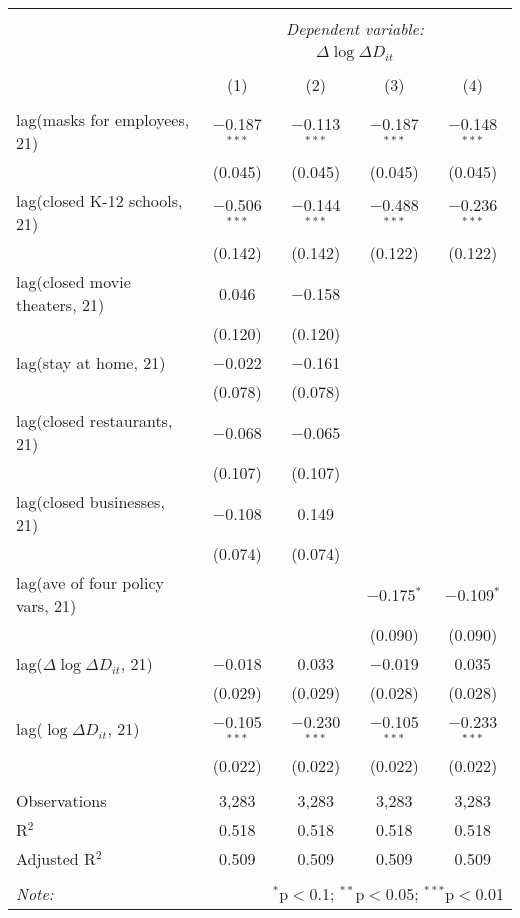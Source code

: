 \begin{tabular}{@{\extracolsep{1pt}}lcccc} 
\\[-1.8ex]\hline 
\hline \\[-1.8ex] 
 & \multicolumn{4}{c}{\textit{Dependent variable:}} \\ 
\cline{2-5} 
 & \multicolumn{4}{c}{$\Delta \log \Delta D_{it}$} \\ 
\\[-1.8ex] & (1) & (2) & (3) & (4)\\ 
\hline \\[-1.8ex] 
 lag(masks for employees, 21) & $-$0.187$^{***}$ & $-$0.113$^{***}$ & $-$0.187$^{***}$ & $-$0.148$^{***}$ \\ 
  & (0.045) & (0.045) & (0.045) & (0.045) \\ 
  lag(closed K-12 schools, 21) & $-$0.506$^{***}$ & $-$0.144$^{***}$ & $-$0.488$^{***}$ & $-$0.236$^{***}$ \\ 
  & (0.142) & (0.142) & (0.122) & (0.122) \\ 
  lag(closed movie theaters, 21) & 0.046 & $-$0.158 &  &  \\ 
  & (0.120) & (0.120) &  &  \\ 
  lag(stay at home, 21) & $-$0.022 & $-$0.161 &  &  \\ 
  & (0.078) & (0.078) &  &  \\ 
  lag(closed restaurants, 21) & $-$0.068 & $-$0.065 &  &  \\ 
  & (0.107) & (0.107) &  &  \\ 
  lag(closed businesses, 21) & $-$0.108 & 0.149 &  &  \\ 
  & (0.074) & (0.074) &  &  \\ 
  lag(ave of four policy vars, 21) &  &  & $-$0.175$^{*}$ & $-$0.109$^{*}$ \\ 
  &  &  & (0.090) & (0.090) \\ 
  lag($\Delta \log \Delta D_{it}$, 21) & $-$0.018 & 0.033 & $-$0.019 & 0.035 \\ 
  & (0.029) & (0.029) & (0.028) & (0.028) \\ 
  lag($\log \Delta D_{it}$, 21) & $-$0.105$^{***}$ & $-$0.230$^{***}$ & $-$0.105$^{***}$ & $-$0.233$^{***}$ \\ 
  & (0.022) & (0.022) & (0.022) & (0.022) \\ 
 \hline \\[-1.8ex] 
Observations & 3,283 & 3,283 & 3,283 & 3,283 \\ 
R$^{2}$ & 0.518 & 0.518 & 0.518 & 0.518 \\ 
Adjusted R$^{2}$ & 0.509 & 0.509 & 0.509 & 0.509 \\ 
\hline 
\hline \\[-1.8ex] 
\textit{Note:}  & \multicolumn{4}{r}{$^{*}$p$<$0.1; $^{**}$p$<$0.05; $^{***}$p$<$0.01} \\ 
\end{tabular} 
